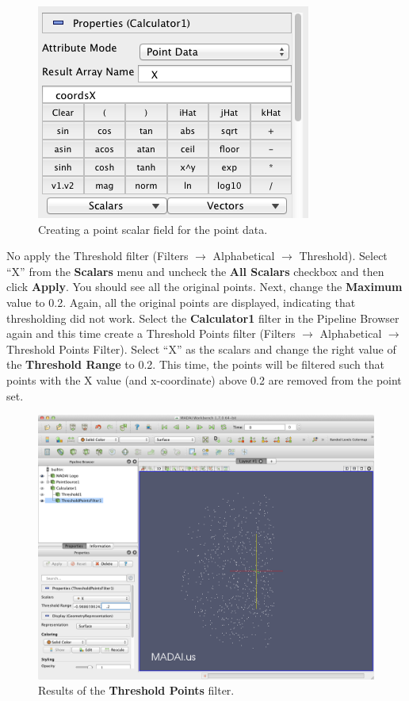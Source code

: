 \documentclass[12pt]{article}
\begin{document}
\begin{figure}[htbp]
   \centering
   \includegraphics[scale=.5]{images/ThresholdPointsFilterCalculator.png} %
   \caption{Creating a point scalar field for the point data.}
   \label{fig:PointsFilterCalculator}
\end{figure}

No apply the Threshold filter (Filters $\rightarrow$ Alphabetical $\rightarrow$ Threshold). Select ``X'' from the \textbf{Scalars} menu and uncheck the \textbf{All Scalars} checkbox and then click \textbf{Apply}. You should see all the original points. Next, change the \textbf{Maximum} value to 0.2. Again, all the original points are displayed, indicating that thresholding did not work. Select the \textbf{Calculator1} filter in the Pipeline Browser again and this time create a Threshold Points filter (Filters $\rightarrow$ Alphabetical $\rightarrow$ Threshold Points Filter). Select ``X'' as the scalars and change the right value of the \textbf{Threshold Range} to 0.2. This time, the points will be filtered such that points with the X value (and x-coordinate) above 0.2 are removed from the point set.

\begin{figure}[htbp]
   \centering
   \includegraphics[scale=.25]{images/ThresholdPointsFilter.png} %
   \caption{Results of the \textbf{Threshold Points} filter.}
   \label{fig:PointsFilterCalculator}
\end{figure}
\end{document}

